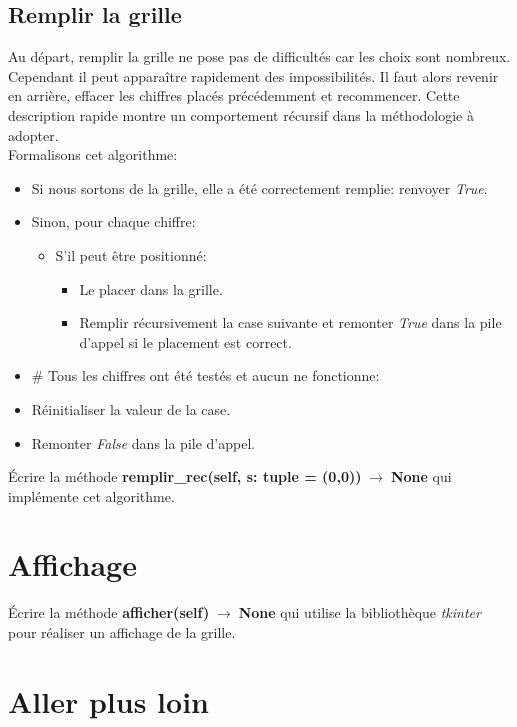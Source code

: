 \documentclass[a4paper,11pt]{article}
\begin{document}
\begin{Form}
\subsection{Remplir la grille}
Au départ, remplir la grille ne pose pas de difficultés car les choix sont nombreux. Cependant il peut apparaître rapidement des impossibilités. Il faut alors revenir en arrière, effacer les chiffres placés précédemment et recommencer. Cette description rapide montre un comportement récursif dans la méthodologie à adopter.\\
Formalisons cet algorithme:
\begin{itemize}
\item Si nous sortons de la grille, elle a été correctement remplie: renvoyer \emph{True}.
\item Sinon, pour chaque chiffre:
\begin{itemize}
\item S'il peut être positionné:
\begin{itemize}
\item Le placer dans la grille.
\item Remplir récursivement la case suivante et remonter \emph{True} dans la pile d'appel si le placement est correct.
\end{itemize}
\end{itemize}
\item \# Tous les chiffres ont été testés et aucun ne fonctionne: 
\item Réinitialiser la valeur de la case.
\item Remonter \emph{False} dans la pile d'appel.
\end{itemize}
\begin{activite}
Écrire la méthode \textbf{remplir\_rec(self, s: tuple = (0,0))$\;\rightarrow\;$None} qui implémente cet algorithme.
\end{activite}
\section{Affichage}
\begin{activite}
Écrire la méthode \textbf{afficher(self)$\;\rightarrow\;$None} qui utilise la bibliothèque \emph{tkinter} pour réaliser un affichage de la grille.
\end{activite}
\section{Aller plus loin}

\end{Form}
\end{document}
